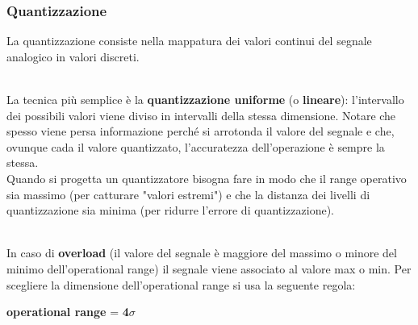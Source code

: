 \documentclass{article}
\begin{document}
			\subsubsection{Quantizzazione}	
				La quantizzazione consiste nella mappatura dei valori continui del segnale analogico in valori discreti.
				\begin{figure}[ht!]
				\end{figure}
				\\La tecnica più semplice è la \textbf{quantizzazione uniforme} (o \textbf{lineare}): l'intervallo dei possibili valori viene diviso in intervalli della stessa dimensione.
				\newpage 
				\noindent 
				Notare che spesso viene persa informazione perché si arrotonda il valore del segnale e che, ovunque cada il valore quantizzato, l'accuratezza dell'operazione è sempre la stessa.
				\\Quando si progetta un quantizzatore bisogna fare in modo che il range operativo sia massimo (per catturare "valori estremi") e che la distanza dei livelli di quantizzazione sia minima (per ridurre l'errore di quantizzazione).
				\begin{figure}[ht!]
				\end{figure}
				\\In caso di \textbf{overload} (il valore del segnale è maggiore del massimo o minore del minimo dell'operational range) il segnale viene associato al valore max o min. Per scegliere la dimensione dell'operational range si usa la seguente regola:
				\begin{center}
					\textbf{operational range} = \textbf{4$\sigma$}
				\end{center}
\end{document}
